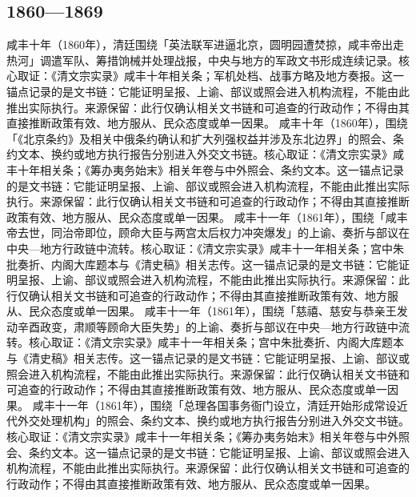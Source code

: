 \subsection{1860—1869}
咸丰十年（1860年），清廷围绕「英法联军进逼北京，圆明园遭焚掠，咸丰帝出走热河」调遣军队、筹措饷械并处理战报，中央与地方的军政文书形成连续记录。核心取证：《清文宗实录》咸丰十年相关条；军机处档、战事方略及地方奏报。这一锚点记录的是文书链：它能证明呈报、上谕、部议或照会进入机构流程，不能由此推出实际执行。来源保留：此行仅确认相关文书链和可追查的行政动作；不得由其直接推断政策有效、地方服从、民众态度或单一因果。
咸丰十年（1860年），围绕「《北京条约》及相关中俄条约确认和扩大列强权益并涉及东北边界」的照会、条约文本、换约或地方执行报告分别进入外交文书链。核心取证：《清文宗实录》咸丰十年相关条；《筹办夷务始末》相关年卷与中外照会、条约文本。这一锚点记录的是文书链：它能证明呈报、上谕、部议或照会进入机构流程，不能由此推出实际执行。来源保留：此行仅确认相关文书链和可追查的行政动作；不得由其直接推断政策有效、地方服从、民众态度或单一因果。
咸丰十一年（1861年），围绕「咸丰帝去世，同治帝即位，顾命大臣与两宫太后权力冲突爆发」的上谕、奏折与部议在中央—地方行政链中流转。核心取证：《清文宗实录》咸丰十一年相关条；宫中朱批奏折、内阁大库题本与《清史稿》相关志传。这一锚点记录的是文书链：它能证明呈报、上谕、部议或照会进入机构流程，不能由此推出实际执行。来源保留：此行仅确认相关文书链和可追查的行政动作；不得由其直接推断政策有效、地方服从、民众态度或单一因果。
咸丰十一年（1861年），围绕「慈禧、慈安与恭亲王发动辛酉政变，肃顺等顾命大臣失势」的上谕、奏折与部议在中央—地方行政链中流转。核心取证：《清文宗实录》咸丰十一年相关条；宫中朱批奏折、内阁大库题本与《清史稿》相关志传。这一锚点记录的是文书链：它能证明呈报、上谕、部议或照会进入机构流程，不能由此推出实际执行。来源保留：此行仅确认相关文书链和可追查的行政动作；不得由其直接推断政策有效、地方服从、民众态度或单一因果。
咸丰十一年（1861年），围绕「总理各国事务衙门设立，清廷开始形成常设近代外交处理机构」的照会、条约文本、换约或地方执行报告分别进入外交文书链。核心取证：《清文宗实录》咸丰十一年相关条；《筹办夷务始末》相关年卷与中外照会、条约文本。这一锚点记录的是文书链：它能证明呈报、上谕、部议或照会进入机构流程，不能由此推出实际执行。来源保留：此行仅确认相关文书链和可追查的行政动作；不得由其直接推断政策有效、地方服从、民众态度或单一因果。
